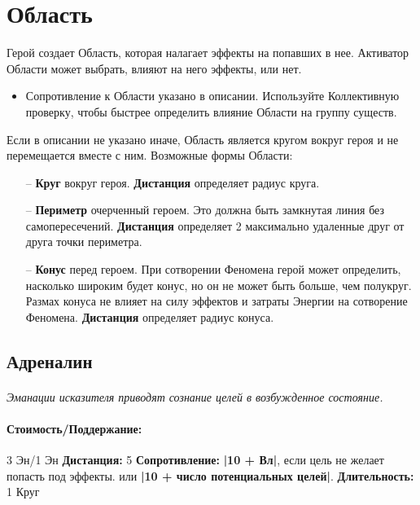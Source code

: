 \section{Область}Герой создает Область, которая налагает эффекты на попавших в нее. Активатор Области может выбрать, влияют на него эффекты, или нет.
\begin{itemize}
 Области определяет максимальное удаление от героя, на котором накладываются эффекты области во время ее активации.
\item Сопротивление к Области указано в описании. Используйте Коллективную проверку, чтобы быстрее определить влияние Области на группу существ.
\end{itemize}Если в описании не указано иначе, Область является кругом вокруг героя и не перемещается вместе с ним.
\newline Возможные формы Области:
\begin{itemize}
\item[--] 
\textbf{Круг} вокруг героя. 
\textbf{Дистанция} определяет радиус круга.
\item[--] 
\textbf{Периметр} очерченный героем. Это должна быть замкнутая линия без самопересечений. 
\textbf{Дистанция} определяет 2 максимально удаленные друг от друга точки периметра.
\item[--] 
\textbf{Конус} перед героем. При сотворении Феномена герой может определить, насколько широким будет конус, но он не может быть больше, чем полукруг. Размах конуса не влияет на силу эффектов и затраты Энергии на сотворение Феномена. 
\textbf{Дистанция} определяет радиус конуса.
\end{itemize}
\subsection{Адреналин}
\paragraph{} 
\textit{Эманации исказителя приводят сознание целей в возбужденное состояние.}
\paragraph{Стоимость/Поддержание: }3 Эн/1 Эн
\newline
\textbf{Дистанция: }5
\newline
\textbf{Сопротивление: }
\textbf{|10 + Вл|}, если цель не желает попасть под эффекты. или 
\textbf{|10 + число потенциальных целей|}.
\tbd
\newline 
\textbf{Длительность: }1 Круг
